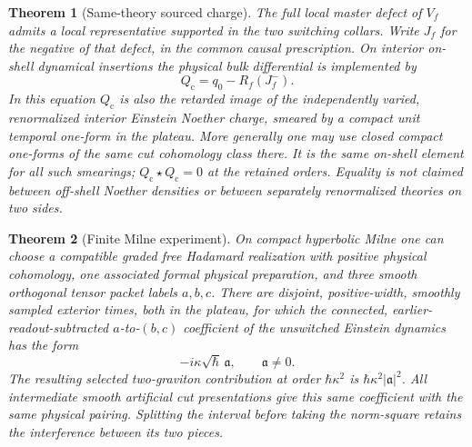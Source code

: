 \documentclass[11pt]{article}
\newtheorem{theorem}{Theorem}
\theoremstyle{remark}
\newcommand{\Cq}{Q_{\mathrm c}}
\begin{document}
\begin{theorem}[Same-theory sourced charge]\label{thm:charge}
The full local master defect of \(V_f\) admits a local representative supported in the two switching collars. Write \(J_f\) for the negative of that defect, in the common causal prescription. On interior on-shell dynamical insertions the physical bulk differential is implemented by
\begin{equation}\label{eq:keycharge}
       \Cq=q_0-R_f(J_f^-).
\end{equation}
In this equation \(\Cq\) is also the retarded image of the independently varied, renormalized interior Einstein Noether charge, smeared by a compact unit temporal one-form in the plateau. More generally one may use closed compact one-forms of the same cut cohomology class there. It is the same on-shell element for all such smearings; \(\Cq\star\Cq=0\) at the retained orders. Equality is not claimed between off-shell Noether densities or between separately renormalized theories on two sides.
\end{theorem}

\begin{theorem}[Finite Milne experiment]\label{thm:experiment}
On compact hyperbolic Milne one can choose a compatible graded free Hadamard realization with positive physical cohomology, one associated formal physical preparation, and three smooth orthogonal tensor packet labels \(a,b,c\). There are disjoint, positive-width, smoothly sampled exterior times, both in the plateau, for which the connected, earlier-readout-subtracted \(a\)-to-\((b,c)\) coefficient of the unswitched Einstein dynamics has the form
\begin{equation}\label{eq:cubicform}
   -i\kappa\sqrt{\hbar}\,\mathfrak a,\qquad \mathfrak a\ne0 .
\end{equation}
The resulting selected two-graviton contribution at order \(\hbar\kappa^2\) is \(\hbar\kappa^2|\mathfrak a|^2\). All intermediate smooth artificial cut presentations give this same coefficient with the same physical pairing. Splitting the interval before taking the norm-square retains the interference between its two pieces.
\end{theorem}
\end{document}
